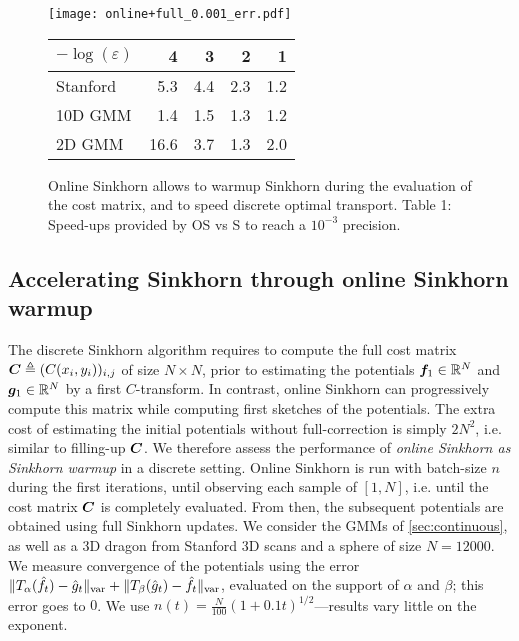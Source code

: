 \begin{figure}[t]
    \begin{minipage}{.7\textwidth}
    \texttt{[image: online+full\_0.001\_err.pdf]}
    \end{minipage}%
    \hfill
    \begin{minipage}{.3\textwidth}
        \tiny
        \begin{tabular}{lrrrr}
            \toprule
            $- \log(\varepsilon)$
            &  4 & 3 & 2 & 1 \\
            \midrule
            Stanford      &     5.3 &    4.4 &    2.3 &    1.2 \\
            10D GMM     &     1.4 &    1.5 &    1.3 &    1.2 \\
            2D GMM      &    16.6 &    3.7 &    1.3 &    2.0 \\
            \bottomrule
            \end{tabular}
    \end{minipage}
    \caption{Online Sinkhorn allows to warmup Sinkhorn during the evaluation of the cost matrix, and to speed discrete optimal transport. Table 1: Speed-ups provided by OS vs S to reach a $10^{-3}$ precision.}
    \label{fig:warmup}
\end{figure}


\subsection{Accelerating Sinkhorn through online Sinkhorn warmup}\label{sec:accelerating}

The discrete Sinkhorn algorithm requires to compute the full cost matrix $\bm{C}
\triangleq (C(x_i,y_i))_{i,j}$  of size $N \times N$, prior to estimating the
potentials $\bm{f}_1 \in \mathbb{R}^N$ and $\bm{g}_1 \in \mathbb{R}^N$ by a first $C$-transform. In
contrast, online Sinkhorn can progressively compute this matrix while computing
first sketches of the potentials. The extra cost of estimating the initial potentials
without full-correction is simply $2 N^2$, i.e. similar to filling-up $\bm{C}$. We
therefore assess the performance of \textit{online Sinkhorn as Sinkhorn warmup}
in a discrete setting. Online Sinkhorn is run with batch-size $n$ during the
first iterations, until observing each sample of $[1,N]$, i.e. until the cost
matrix $\bm{C}$ is completely evaluated. From then, the
subsequent potentials are obtained using full Sinkhorn updates. We consider the
GMMs of \autoref{sec:continuous}, as well as a 3D dragon from Stanford 3D scans
\cite{turk1994zippered} and a sphere of size $N=12000$. We measure
convergence of the potentials using the error $\Vert
T_{\alpha}(\hat f_t) - \hat g_t \Vert_{\text{\upshape var}} + \Vert T_{\beta}(\hat
g_t) - \hat f_t \Vert_{\text{\upshape var}}$, evaluated on the support of $\alpha$ and $\beta$; this error
goes to $0$. We use $n(t) = \frac{N}{100} (1+0.1t)^{1/2}$---results vary little on the exponent.


